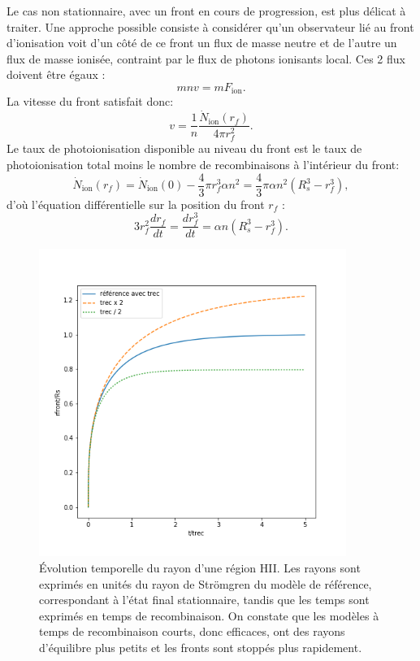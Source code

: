 Le cas non stationnaire, avec un front en cours de progression, est plus délicat à traiter. Une approche possible consiste à considérer qu'un observateur lié au front d'ionisation voit d'un côté de ce front un flux de masse neutre et de l'autre un flux de masse ionisée, contraint par le flux de photons ionisants local. Ces 2 flux doivent être égaux :
\begin{equation}
m n v = m F_\mathrm{ion}.
\end{equation}
La vitesse du front satisfait donc:
\begin{equation}
v=\frac{1}{n}\frac{\dot N_\mathrm{ion}(r_f)}{4\pi r_f^2}.
\end{equation}
Le taux de photoionisation disponible au niveau du front est le taux de photoionisation total moins le nombre de recombinaisons à l'intérieur du front:
\begin{equation}
\dot N_\mathrm{ion}(r_f)=\dot N_\mathrm{ion}(0)-\frac{4}{3}\pi r_f^3\alpha n^2=\frac{4}{3}\pi \alpha n^2 (R_s^3-r_f^3),
\end{equation}
d'où l'équation différentielle sur la position du front $r_f$ :
\begin{equation}
3r_f^2\frac{d r_f}{dt}=\frac{dr_f^3}{dt}=\alpha n  (R_s^3-r_f^3).
\end{equation}

\begin{figure}[htbp]
	\centering
		\includegraphics[height=10cm]{figs/strom.png}
		\caption[Évolution temporelle de la position d'un front ionisant]{Évolution temporelle du rayon d'une région HII. Les rayons sont exprimés en unités du rayon de Strömgren du modèle de référence, correspondant à l'état final stationnaire, tandis que les temps sont exprimés en temps de recombinaison. On constate que les modèles à temps de recombinaison courts, donc efficaces, ont des rayons d'équilibre plus petits et les fronts sont stoppés plus rapidement.}
	\label{f:strom}
\end{figure}

